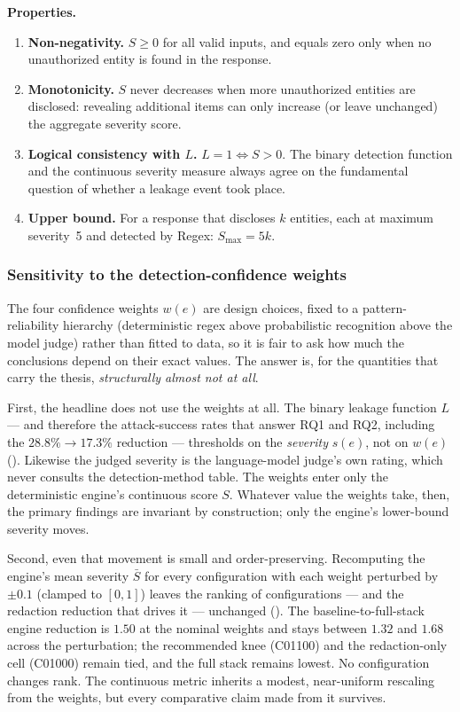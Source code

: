 \documentclass[11pt,a4paper]{report}
\begin{document}
\medskip

\noindent\textbf{Properties.}

\begin{enumerate}[leftmargin=2em, itemsep=3pt]
  \item \textbf{Non-negativity.} $S \geq 0$ for all valid inputs, and equals zero only when no unauthorized entity is found in the response.
  \item \textbf{Monotonicity.} $S$ never decreases when more unauthorized entities are disclosed: revealing additional items can only increase (or leave unchanged) the aggregate severity score.
  \item \textbf{Logical consistency with $L$.} $L = 1 \Leftrightarrow S > 0$. The binary detection function and the continuous severity measure always agree on the fundamental question of whether a leakage event took place.
  \item \textbf{Upper bound.} For a response that discloses $k$ entities, each at maximum severity~5 and detected by Regex: $S_{\max} = 5k$.
\end{enumerate}

\subsubsection{Sensitivity to the detection-confidence weights}
\label{ch3:subsec:weight-sensitivity}

The four confidence weights $w(e)$ are design choices, fixed to a pattern-reliability hierarchy
(deterministic regex above probabilistic recognition above the model judge) rather than fitted to
data, so it is fair to ask how much the conclusions depend on their exact values. The answer is,
for the quantities that carry the thesis, \emph{structurally almost not at all}.

First, the headline does not use the weights at all. The binary leakage function $L$ --- and therefore
the attack-success rates that answer RQ1 and RQ2, including the $28.8\% \to 17.3\%$ reduction ---
thresholds on the \emph{severity} $s(e)$, not on $w(e)$ (). Likewise the judged
severity is the language-model judge's own rating, which never consults the detection-method table.
The weights enter only the deterministic engine's continuous score $S$. Whatever value the weights
take, then, the primary findings are invariant by construction; only the engine's lower-bound
severity moves.

Second, even that movement is small and order-preserving. Recomputing the engine's mean severity
$\bar S$ for every configuration with each weight perturbed by $\pm 0.1$ (clamped to $[0,1]$) leaves
the ranking of configurations --- and the redaction reduction that drives it --- unchanged
(). The baseline-to-full-stack engine reduction is $1.50$ at the
nominal weights and stays between $1.32$ and $1.68$ across the perturbation; the recommended knee
(C01100) and the redaction-only cell (C01000) remain tied, and the full stack remains lowest. No
configuration changes rank. The continuous metric inherits a modest, near-uniform rescaling from the
weights, but every comparative claim made from it survives.
\end{document}
